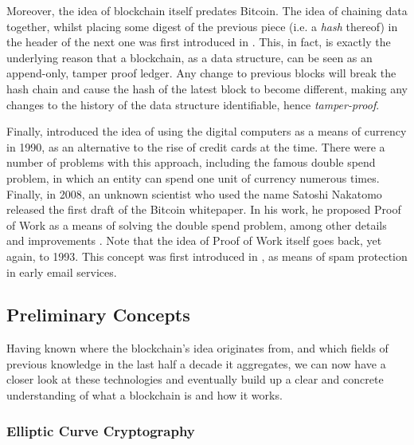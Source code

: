 Moreover, the idea of blockchain itself predates Bitcoin. The idea of chaining data together,
whilst placing some digest of the previous piece (i.e. a \textit{hash} thereof) in the header of the
next one was first introduced in \cite{haberHowTimestampDigital1991}. This, in fact, is exactly the
underlying reason that a blockchain, as a data structure, can be seen as an append-only, tamper proof
ledger. Any change to previous blocks will break the hash chain and cause the hash of the latest
block to become different, making any changes to the history of the data structure identifiable,
hence \textit{tamper-proof}.

Finally, \cite{chaumUntraceableElectronicCash1990} introduced the idea of using the digital
computers as a means of currency in 1990, as an alternative to the rise of credit cards at the time.
There were a number of problems with this approach, including the famous double spend problem, in
which an entity can spend one unit of currency numerous times. Finally, in 2008, an unknown scientist
who used the name Satoshi Nakatomo released the first draft of the Bitcoin whitepaper. In his work,
he proposed Proof of Work as a means of solving the double spend problem, among other details and
improvements \cite{nakamotoBitcoinPeertoPeerElectronic}. Note that the idea of Proof of Work itself
goes back, yet again, to 1993. This concept was first introduced in
\cite{dworkPricingProcessingCombatting1993}, as means of spam protection in early email services.

\subsection{Preliminary Concepts} \label{chap_bg:sec:preliminary}

Having known where the blockchain's idea originates from, and which fields of previous knowledge in
the last half a decade it aggregates, we can now have a closer look at these technologies and
eventually build up a clear and concrete understanding of what a blockchain is and how it works.

\subsubsection{Elliptic Curve Cryptography} \label{chap_bg:subsec:ecc}

